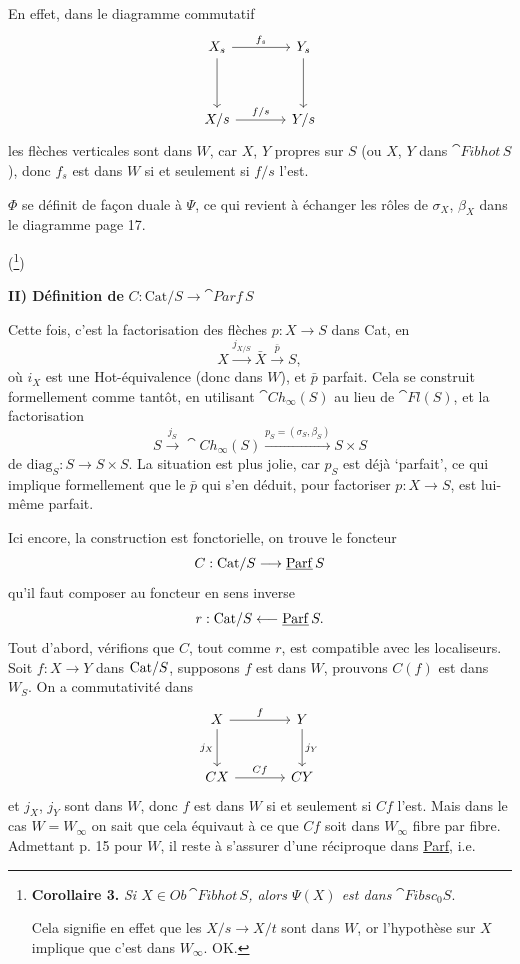 En effet, dans le diagramme commutatif
\[
\begin{tikzcd}[column sep=large, row sep=huge]
X_s \arrow[r, "f_s"] \arrow[d] & Y_s \arrow[d] \\
X/s \arrow[r, "f/s"] & Y/s
\end{tikzcd}
\]
les flèches verticales sont dans $W$, car $X$, $Y$ propres sur $S$ (ou $X$, $Y$ dans $\cat{Fibhot}\,S$), donc $f_s$ est dans $W$ si et seulement si $f/s$ l'est.

 $\Phi$ se définit de façon duale à $\Psi$, ce qui revient à échanger les rôles de $\sigma_X$, $\beta_X$ dans le diagramme page 17.

(\footnote[13]{\textbf{Corollaire 3.} \textit{Si $X \in \mathit{Ob}\,$}$\cat{Fibhot}\,S$\textit{, alors $\Psi(X)$ est dans} $\cat{Fibsc}_0S$.\par Cela signifie en effet que les $X/s \longrightarrow X/t$ sont dans $W$, or l'hypothèse sur $X$ implique que c'est dans $W_\infty$. OK.})

\textbf{II) Définition de} $C : \mathrm{Cat}/S \longrightarrow \cat{Parf}\,S$

Cette fois, c'est la factorisation des flèches $p : X \longrightarrow S$ dans Cat, en
\[
X \xrightarrow{j_{X/S}} \bar{X} \xrightarrow{\bar{p}} S,
\]
où $i_X$ est une Hot-équivalence (donc dans $W$), et $\bar{p}$ parfait. Cela se construit formellement comme tantôt, en utilisant $\cat{Ch}_\infty(S)$ au lieu de $\cat{Fl}(S)$, et la factorisation
\[
S \xrightarrow{j_S} \cat{Ch}_\infty(S) \xrightarrow{p_S=(\sigma_S,\beta_S)} S \times S
\]
de $\mathrm{diag}_S : S \longrightarrow S \times S$. La situation est plus jolie, car $p_S$ est déjà `parfait', ce qui implique formellement que le $\bar{p}$ qui s'en déduit, pour factoriser $p : X \longrightarrow S$, est lui-même parfait.


Ici encore, la construction est fonctorielle, on trouve le foncteur
\[ C : \mathrm{Cat}/S \longrightarrow \underline{\mathrm{Parf}}\,S \]
qu'il faut composer au foncteur en sens inverse
\[ r : \mathrm{Cat}/S \longleftarrow \underline{\mathrm{Parf}}\,S. \]
Tout d'abord, vérifions que $C$, tout comme $r$, est compatible avec les localiseurs. Soit $f : X \longrightarrow Y$ dans $\mathrm{Cat}/S$, supposons $f$ est dans $W$, prouvons $C(f)$ est dans $W_S$. On a commutativité dans
\[
\begin{tikzcd}[row sep=large, column sep=large]
X \arrow[r, "f"] \arrow[d, "j_X"'] & Y \arrow[d, "j_Y"] \\
CX \arrow[r, "Cf"] & CY
\end{tikzcd}
\]
et $j_X$, $j_Y$ sont dans $W$, donc $f$ est dans $W$ si et seulement si $Cf$ l'est. Mais dans le cas $W = W_\infty$ on sait que cela équivaut à ce que $Cf$ soit dans $W_\infty$ fibre par fibre. Admettant  p. 15 pour $W$, il reste à s'assurer d'une réciproque dans \underline{Parf}, i.e.

